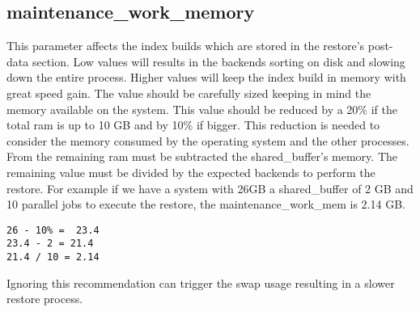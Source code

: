 \subsection{maintenance\_work\_memory}
This parameter affects the index builds which are stored in the restore's post-data section. Low 
values will results in the backends sorting on disk and slowing down the entire process. Higher
values will keep the index build in memory with great speed gain. The value should be carefully
sized keeping in mind the memory available on the system. This value should be reduced by a 20\% if
the total ram is up to 10 GB and by 10\% if bigger. This reduction is needed to consider the memory
consumed by the operating system and the other processes. From the remaining ram must be subtracted
the shared\_buffer's memory. The remaining value must be divided by the expected backends to
perform the restore. For example if we have a system with 26GB a shared\_buffer of 2 GB and 10
parallel jobs to execute the restore, the maintenance\_work\_mem is  2.14 GB.
\newpage
\begin{verbatim}
26 - 10% =  23.4
23.4 - 2 = 21.4
21.4 / 10 = 2.14
\end{verbatim}

Ignoring this recommendation can trigger the swap usage resulting in a slower restore process.
